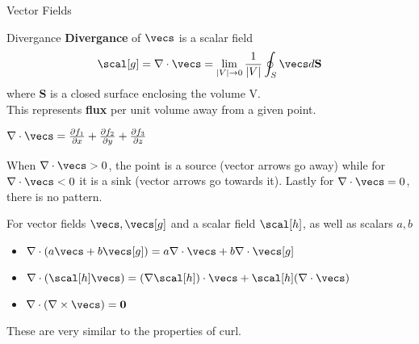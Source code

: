 \documentclass[12pt, letterpaper]{article}
\newcommand{\pder}[2]{\frac{\partial{} #1}{\partial{} #2}}
\begin{document}
\begin{section}{Vector Fields}
\begin{subsection}{Divergance}
    \textbf{Divergance} of \(\vecs\) is a scalar field \[\scal[g] =
      \nabla \cdot \vecs = \lim_{| V | \to 0} \frac{1}{| V |} \oint_{S} \vecs d
      \textbf{S}\] where \textbf{S} is a closed surface enclosing the volume V.
    \\
    This represents \textbf{flux} per unit volume away from a given point.

    \(\nabla \cdot \vecs = \pder{f_{1}}{x} + \pder{f_{2}}{y} + \pder{f_{3}}{z}\)

    When \(\nabla \cdot \vecs > 0\), the point is a source (vector arrows go
    away) while for \(\nabla \cdot \vecs < 0\) it is a sink (vector arrows go
    towards it). Lastly for \(\nabla \cdot \vecs = 0\), there is no pattern.

    For vector fields \(\vecs, \vecs[g]\) and a scalar field \(\scal[h]\), as
    well as scalars \(a, b\)
    \begin{itemize}
      \item \(\nabla \cdot (a \vecs + b \vecs[g]) =
            a \nabla \cdot \vecs + b \nabla \cdot \vecs[g]\)
      \item \(\nabla \cdot (\scal[h] \vecs) =
            (\nabla \scal[h]) \cdot \vecs + \scal[h] (\nabla \cdot \vecs)\)
      \item \(\nabla \cdot (\nabla \times \vecs) = \textbf{0}\)
    \end{itemize}

    These are very similar to the properties of curl.

  \end{subsection}

\end{section}

\newpage
\end{document}
